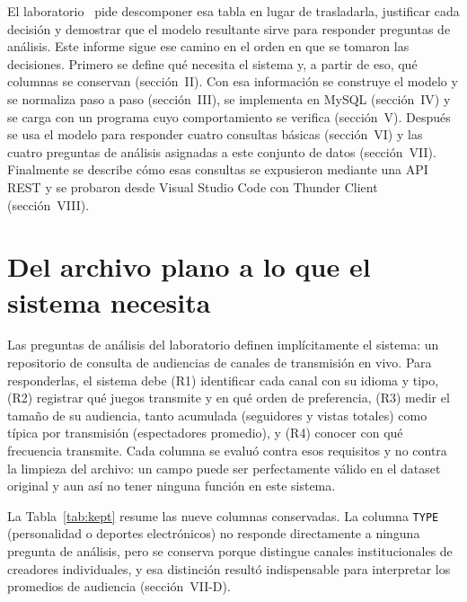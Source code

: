 \documentclass[conference]{IEEEtran}
\begin{document}
El laboratorio~\cite{guia} pide descomponer esa tabla en lugar de trasladarla, justificar cada decisión y demostrar que el modelo resultante sirve para responder preguntas de análisis. Este informe sigue ese camino en el orden en que se tomaron las decisiones. Primero se define qué necesita el sistema y, a partir de eso, qué columnas se conservan (sección~II). Con esa información se construye el modelo y se normaliza paso a paso (sección~III), se implementa en MySQL (sección~IV) y se carga con un programa cuyo comportamiento se verifica (sección~V). Después se usa el modelo para responder cuatro consultas básicas (sección~VI) y las cuatro preguntas de análisis asignadas a este conjunto de datos (sección~VII). Finalmente se describe cómo esas consultas se expusieron mediante una API REST y se probaron desde Visual Studio Code con Thunder Client (sección~VIII).

\section{Del archivo plano a lo que el sistema necesita}
Las preguntas de análisis del laboratorio definen implícitamente el sistema: un repositorio de consulta de audiencias de canales de transmisión en vivo. Para responderlas, el sistema debe (R1) identificar cada canal con su idioma y tipo, (R2) registrar qué juegos transmite y en qué orden de preferencia, (R3) medir el tamaño de su audiencia, tanto acumulada (seguidores y vistas totales) como típica por transmisión (espectadores promedio), y (R4) conocer con qué frecuencia transmite. Cada columna se evaluó contra esos requisitos y no contra la limpieza del archivo: un campo puede ser perfectamente válido en el dataset original y aun así no tener ninguna función en este sistema.

La Tabla~\ref{tab:kept} resume las nueve columnas conservadas. La columna \texttt{TYPE} (personalidad o deportes electrónicos) no responde directamente a ninguna pregunta de análisis, pero se conserva porque distingue canales institucionales de creadores individuales, y esa distinción resultó indispensable para interpretar los promedios de audiencia (sección~VII-D).
\end{document}
